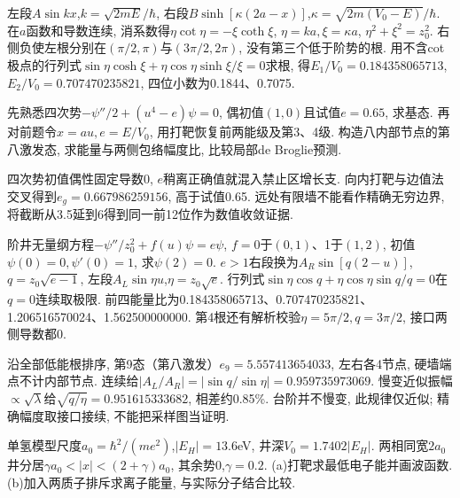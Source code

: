 \begin{solution}
左段$A\sin kx$,$k=\sqrt{2mE}/\hbar$, 右段$B\sinh[\kappa(2a-x)]$,$\kappa=\sqrt{2m(V_0-E)}/\hbar$. 在$a$函数和导数连续, 消系数得$\eta\cot\eta=-\xi\coth\xi$, $\eta=ka,\xi=\kappa a$, $\eta^2+\xi^2=z_0^2$. 右侧负使左根分别在$(\pi/2,\pi)$与$(3\pi/2,2\pi)$, 没有第三个低于阶势的根. 用不含cot极点的行列式$\sin\eta\cosh\xi+\eta\cos\eta\sinh\xi/\xi=0$求根, 得$E_1/V_0=0.184358065713$, $E_2/V_0=0.707470235821$, 四位小数为0.1844、0.7075.
\end{solution}
\begin{exercise}
先熟悉四次势$-\psi''/2+(u^4-e)\psi=0$, 偶初值$(1,0)$且试值$e=0.65$, 求基态. 再对前题令$x=au,e=E/V_0$, 用打靶恢复前两能级及第3、4级. 构造八内部节点的第八激发态, 求能量与两侧包络幅度比, 比较局部de Broglie预测.
\end{exercise}
\begin{solution}
四次势初值偶性固定导数0, $e$稍离正确值就混入禁止区增长支. 向内打靶与边值法交叉得到$e_g=0.667986259156$, 高于试值0.65. 远处有限墙不能看作精确无穷边界, 将截断从3.5延到6得到同一前12位作为数值收敛证据.

阶井无量纲方程$-\psi''/z_0^2+f(u)\psi=e\psi$, $f=0$于$(0,1)$、1于$(1,2)$, 初值$\psi(0)=0,\psi'(0)=1$, 求$\psi(2)=0$. $e>1$右段换为$A_R\sin[q(2-u)]$,$q=z_0\sqrt{e-1}$, 左段$A_L\sin\eta u$,$\eta=z_0\sqrt e$. 行列式$\sin\eta\cos q+\eta\cos\eta\sin q/q=0$在$q=0$连续取极限. 前四能量比为0.184358065713、0.707470235821、1.206516570024、1.562500000000. 第4根还有解析校验$\eta=5\pi/2,q=3\pi/2$, 接口两侧导数都0.

沿全部低能根排序, 第9态（第八激发）$e_9=5.557413654033$, 左右各4节点, 硬墙端点不计内部节点. 连续给$|A_L/A_R|=|\sin q/\sin\eta|=0.959735973069$. 慢变近似振幅$\propto\sqrt\lambda$给$\sqrt{q/\eta}=0.951615333682$, 相差约0.85\%. 台阶并不慢变, 此规律仅近似; 精确幅度取接口接续, 不能把采样图当证明.

\end{solution}
\begin{exercise}
单氢模型尺度$a_0=\hbar^2/(me^2)$,$|E_H|=13.6$eV, 井深$V_0=1.7402|E_H|$. 两相同宽$2a_0$井分居$\gamma a_0<|x|<(2+\gamma)a_0$, 其余势0,$\gamma=0.2$. (a)打靶求最低电子能并画波函数. (b)加入两质子排斥求离子能量, 与实际分子结合比较.
\end{exercise}
